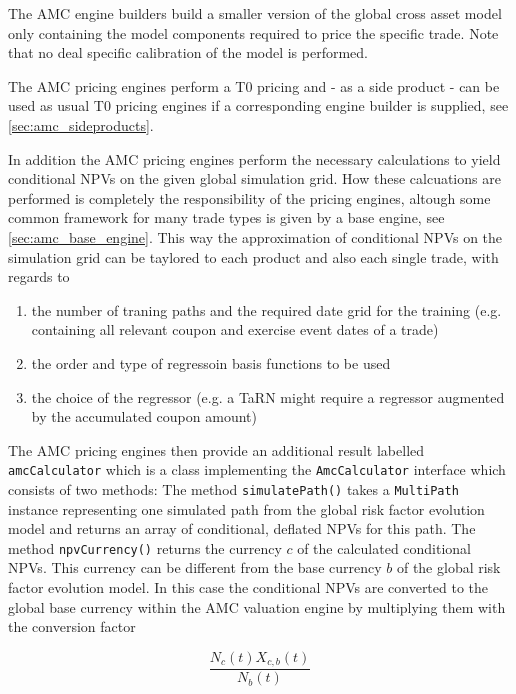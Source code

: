 \documentclass[12pt, a4paper]{article}
\begin{document}
{\begin{appendix}
The AMC engine builders build a smaller version of the global cross asset model only containing the model components
required to price the specific trade. Note that no deal specific calibration of the model is performed.

The AMC pricing engines perform a T0 pricing and - as a side product - can be used as usual T0 pricing engines if a
corresponding engine builder is supplied, see \ref{sec:amc_sideproducts}.

In addition the AMC pricing engines perform the necessary calculations to yield conditional NPVs on the given global
simulation grid. How these calcuations are performed is completely the responsibility of the pricing engines, altough
some common framework for many trade types is given by a base engine, see \ref{sec:amc_base_engine}. This way the
approximation of conditional NPVs on the simulation grid can be taylored to each product and also each single trade,
with regards to

\begin{enumerate}
\item the number of traning paths and the required date grid for the training (e.g. containing all relevant coupon and
  exercise event dates of a trade)
\item the order and type of regressoin basis functions to be used
\item the choice of the regressor (e.g. a TaRN might require a regressor augmented by the accumulated coupon amount)
\end{enumerate}

The AMC pricing engines then provide an additional result labelled \verb+amcCalculator+ which is a class implementing
the \verb+AmcCalculator+ interface which consists of two methods: The method \verb+simulatePath()+ takes a
\verb+MultiPath+ instance representing one simulated path from the global risk factor evolution model and returns an
array of conditional, deflated NPVs for this path. The method \verb+npvCurrency()+ returns the currency $c$ of the
calculated conditional NPVs. This currency can be different from the base currency $b$ of the global risk factor
evolution model. In this case the conditional NPVs are converted to the global base currency within the AMC valuation
engine by multiplying them with the conversion factor

\begin{equation}\label{currency_conversion_factor}
\frac{N_c(t) X_{c,b}(t)}{N_b(t)}
\end{equation}


\end{appendix}}
\end{document}
